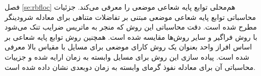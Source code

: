 فصل
\ref{se:rbfloc}
هم‌محلی توابع پایه شعاعی موضعی را معرفی می‌کند. جزئیات محاسباتی توابع پایه شعاعی موضعی مبتنی بر تفاضلات متناهی برای معادله شرودینگر
مطرح شده است. دقت محاسباتی این روش که منجر به ماتریس ضرایب تنک می‌شود با روش فراگیر و سایر روش‌ها مقایسه شده است. همچنین روش توابع پایه شعاعی بر اساس افراز واحد بعنوان یک روش کارای موضعی برای مسایل با مقیاس بالا معرفی شده است. پیاده سازی این روش برای مسایل وابسته به زمان ارایه شده و جزییات محاسباتی آن برای معادله نفوذ گرمای وابسته به زمان دوبعدی
نشان داده شده است.

%


